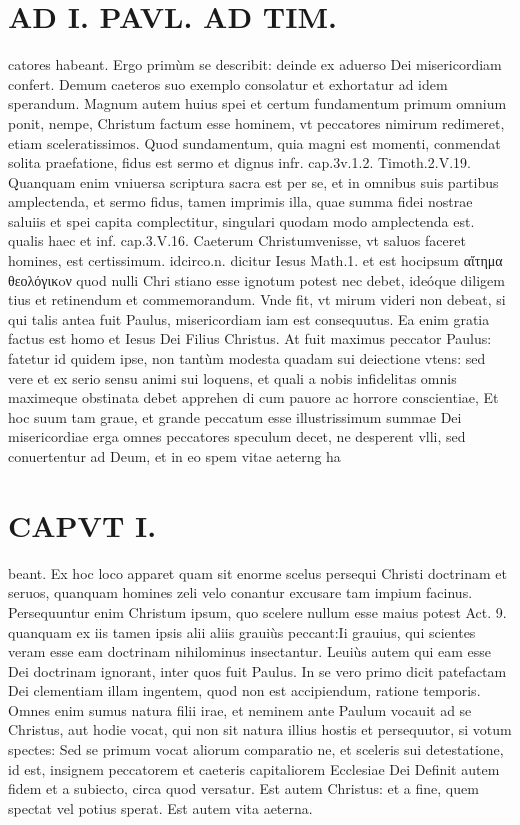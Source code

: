 \documentclass{article}
\begin{document}
\begin{pages}
\section*{AD I. PAVL. AD TIM. }
\marginpar{[ p.28. ]}\pstart catores habeant. Ergo primùm se describit: deinde ex aduerso Dei misericordiam confert. Demum caeteros suo exemplo consolatur et exhortatur ad idem sperandum. Magnum autem huius spei et certum fundamentum primum omnium ponit, nempe, Christum factum esse hominem, vt peccatores nimirum redimeret, etiam sceleratissimos. Quod sundamentum, quia magni est momenti, conmendat solita praefatione, fidus est sermo et dignus infr. cap.3v.1.2. Timoth.2.V.19. Quanquam enim vniuersa scriptura sacra est per se, et in omnibus suis partibus amplectenda, et sermo fidus, tamen imprimis illa, quae summa fidei nostrae saluiis et spei capita complectitur, singulari quodam modo amplectenda est. qualis haec et inf. cap.3.V.16. Caeterum Christumvenisse, vt saluos faceret homines, est certissimum. idcirco.n. dicitur Iesus Math.1. et est hocipsum αἴτημα θεολόγικoν quod nulli Chri stiano esse ignotum potest nec debet, ideóque  diligem tius et retinendum et commemorandum. Vnde fit, vt mirum videri non debeat, si qui talis antea fuit Paulus, misericordiam iam est consequutus. Ea enim gratia factus est homo et Iesus Dei Filius Christus. At fuit maximus peccator Paulus: fatetur id quidem ipse, non tantùm modesta quadam sui deiectione vtens: sed vere et ex serio sensu animi sui loquens, et quali a nobis infidelitas omnis maximeque obstinata debet apprehen di cum pauore ac horrore conscientiae, Et hoc suum tam graue, et grande peccatum esse illustrissimum summae Dei misericordiae erga omnes peccatores speculum decet, ne desperent vlli, sed conuertentur ad Deum, et in eo spem vitae aeterng ha\pend
\section*{CAPVT I. }
\marginpar{[ p.29 ]}\pstart beant. Ex hoc loco apparet quam sit enorme scelus persequi Christi doctrinam et seruos, quanquam homines zeli velo conantur excusare tam impium facinus. Persequuntur enim Christum ipsum, quo scelere nullum esse maius potest Act. 9. quanquam ex iis tamen ipsis alii aliis grauiùs peccant:Ii grauius, qui scientes veram esse eam doctrinam nihilominus insectantur. Leuiùs autem qui eam esse Dei doctrinam ignorant, inter quos fuit Paulus. In se vero primo dicit patefactam Dei clementiam illam ingentem, quod non est accipiendum, ratione temporis. Omnes enim sumus natura filii irae, et neminem ante Paulum vocauit ad se Christus, aut hodie vocat, qui non sit natura illius hostis et persequutor, si votum spectes: Sed se primum vocat aliorum comparatio ne, et sceleris sui detestatione, id est, insignem peccatorem et caeteris capitaliorem Ecclesiae Dei Definit autem fidem et a subiecto, circa quod versatur. Est autem Christus: et a fine, quem spectat vel potius sperat. Est autem vita aeterna.  \pend
{}
{}

\end{pages}
\end{document}
